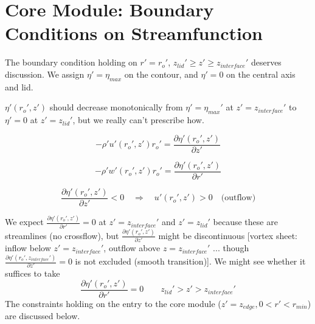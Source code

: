 \documentclass[preprint, prX]{revtex4}
\newcommand{\pd}[2]{\frac{\partial#1}{\partial#2}}
\newcommand{\rmin}{r_{min}}
\newcommand{\zedge}{z_{edge}}
\newcommand{\zinter}{z_{interface}}
\begin{document}
\section{Core Module: Boundary Conditions on Streamfunction}

\begin{figure}[h!]
	\centering
	\def\svgwidth{0.7\columnwidth}
	
\end{figure}

The boundary condition holding on $r'=r_o'$, $z_{lid}'\geq z' \geq \zinter'$ deserves discussion. We assign $\eta'=\eta_{max}$ on the contour, and $\eta'=0$ on the central axis and lid.

$\eta'(r_o',z')$ should decrease monotonically from $\eta' = \eta_{max}'$ at $z'=\zinter'$ to $\eta'=0$ at $z'=z_{lid}'$, but we really can't prescribe how.

\begin{equation}
-\rho' u'(r_o',z')r_o' = \pd{\eta'(r_o',z')}{z'}
\end{equation}

\begin{equation}
-\rho' w'(r_o',z')r_o' = \pd{\eta'(r_o',z')}{r'}
\end{equation}


\begin{equation}
\pd{\eta'(r_o',z')}{z'} <0 \quad \Rightarrow \quad u'(r_o',z') > 0 \quad \text{(outflow)}
\end{equation}

We expect $\pd{\eta'(r_o',z')}{r'} =0$ at $z'=\zinter'$ and $z'=z_{lid}'$ because these are streamlines (no crossflow), but $\pd{\eta'(r_o',z')}{z'}$ might be discontinuous [vortex sheet: inflow below $z'=\zinter'$, outflow above $z=\zinter'$ ... though $\pd{\eta'(r_o',\zinter')}{z'} = 0$ is not excluded (smooth transition)]. We might see whether it suffices to take
\begin{equation}
\pd{\eta'(r_o',z')}{r'} = 0 \qquad z_{lid}'> z'> \zinter'
\end{equation}
The constraints holding on the entry to the core module ($z'=\zedge, 0 < r' < \rmin$) are discussed below.
\end{document}
